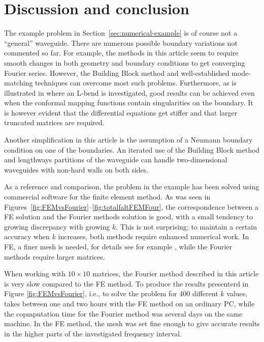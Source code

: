 \documentclass[numreferences]{kluwer}
\begin{document}
\section{Discussion and conclusion}
\label{sec:conclusion}

The example problem in Section~\ref{sec:numerical-example} is of
course not a ``general'' wave\-guide. There are numerous possible
boundary variations not commented so far. For example, the methods in
this article seem to require smooth changes in both geometry and
boundary conditions to get converging Fourier series. However, the
Building Block method and well-established mode-matching techniques
can overcome most such problems. Furthermore, as is illustrated in
\cite{Nilsson:2002} where an L-bend is investigated, good results can
be achieved even when the conformal mapping functions contain
singularities on the boundary. It is however evident that the
differential equations get stiffer and that larger truncated matrices
are required.

Another simplification in this article is the assumption of a Neumann
boundary condition on one of the boundaries. An iterated use of the
Building Block method and lengthways partitions of the waveguide can
handle two-dimensional waveguides with non-hard walls on both sides.


As a reference and comparison, the problem in the example has been
solved using commercial software for the finite element method.
As was seen in
Figures~\ref{fig:FEMvsFourier}--\ref{fig:totalfaltFEMFour}, the
correspondence between a FE solution and the Fourier methods solution
is good, with a small tendency to growing discrepancy with growing
$k$. This is not surprising; to maintain a certain accuracy when $k$
increases, both methods require enhanced numerical work. In FE, a
finer mesh is needed, for details see for example
\cite{Ihlenburg:1998}, while the Fourier methods require larger
matrices.

When working with $10\times10$ matrices, the Fourier method described
in this article is very slow compared to the FE method. To produce the
results presenterd in Figure \ref{fig:FEMvsFourier}, i.e., to solve
the problem for 400 different $k$ values, takes between one and two hours
with the FE method on an ordinary PC, while the copmputation
time for the Fourier method was several days on the same machine. In
the FE method, the mesh was set fine enough to give accurate results
in the higher parts of the investigated frequency interval.
\end{document}
